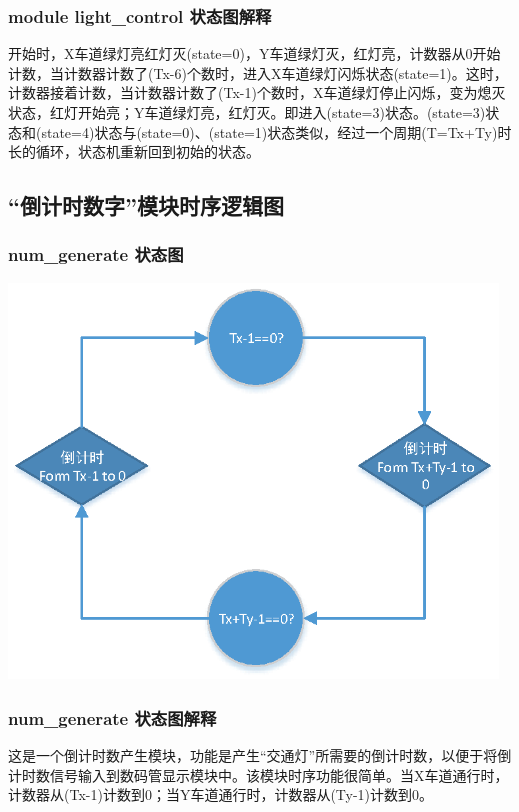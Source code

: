 \documentclass[12pt,a4paper]{article}
\begin{document}
	\subsubsection{module light\_control 状态图解释}		
	开始时，X车道绿灯亮红灯灭(state=0)，Y车道绿灯灭，红灯亮，计数器从0开始计数，当计数器计数了(Tx-6)个数时，进入X车道绿灯闪烁状态(state=1)。这时，计数器接着计数，当计数器计数了(Tx-1)个数时，X车道绿灯停止闪烁，变为熄灭状态，红灯开始亮；Y车道绿灯亮，红灯灭。即进入(state=3)状态。(state=3)状态和(state=4)状态与(state=0)、(state=1)状态类似，经过一个周期(T=Tx+Ty)时长的循环，状态机重新回到初始的状态。
	
	\subsection{“倒计时数字”模块时序逻辑图}
		\subsubsection{num\_generate 状态图}
		\begin{center}
		\includegraphics[width=13cm]{pic/num.eps}
		\end{center}
	\subsubsection{num\_generate 状态图解释}
	这是一个倒计时数产生模块，功能是产生“交通灯”所需要的倒计时数，以便于将倒计时数信号输入到数码管显示模块中。该模块时序功能很简单。当X车道通行时，计数器从(Tx-1)计数到0；当Y车道通行时，计数器从(Ty-1)计数到0。
	
\end{document}
